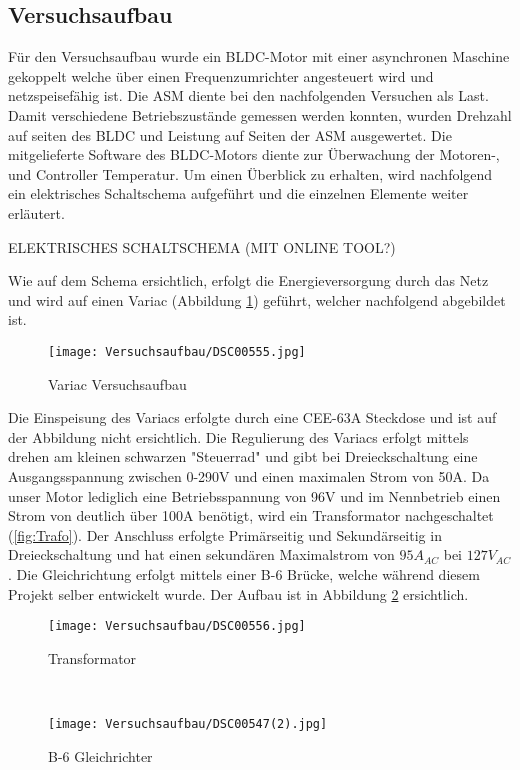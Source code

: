 \subsection{Versuchsaufbau}\label{subsec:Versuchsaufbau}
Für den Versuchsaufbau wurde ein BLDC-Motor mit einer asynchronen Maschine gekoppelt welche über einen Frequenzumrichter angesteuert wird und netzspeisefähig ist. Die ASM diente bei den nachfolgenden Versuchen als Last. Damit verschiedene Betriebszustände gemessen werden konnten, wurden Drehzahl auf seiten des BLDC und Leistung auf Seiten der ASM ausgewertet. Die mitgelieferte Software des BLDC-Motors diente zur Überwachung der Motoren-, und Controller Temperatur. Um einen Überblick zu erhalten, wird nachfolgend ein elektrisches Schaltschema aufgeführt und die einzelnen Elemente weiter erläutert.


ELEKTRISCHES SCHALTSCHEMA (MIT ONLINE TOOL?)



Wie auf dem Schema ersichtlich, erfolgt die Energieversorgung durch das Netz und wird auf einen Variac (Abbildung \ref{fig:Variac}) geführt, welcher nachfolgend abgebildet ist.

\begin{figure}[H]
	\begin{center}
		\texttt{[image: Versuchsaufbau/DSC00555.jpg]}
		\caption[Variac Versuchsaufbau]{Variac Versuchsaufbau}
		\label{fig:Variac}
	\end{center}
\end{figure}

Die Einspeisung des Variacs erfolgte durch eine CEE-63A Steckdose und ist auf der Abbildung nicht ersichtlich. Die Regulierung des Variacs erfolgt mittels drehen am kleinen schwarzen "Steuerrad" und gibt bei Dreieckschaltung eine Ausgangsspannung zwischen 0-290V und einen maximalen Strom von 50A. Da unser Motor lediglich eine Betriebsspannung von 96V und im Nennbetrieb einen Strom von deutlich über 100A benötigt, wird ein Transformator nachgeschaltet (\ref{fig:Trafo}). Der Anschluss erfolgte Primärseitig und Sekundärseitig in Dreieckschaltung und hat einen sekundären Maximalstrom von $95A_{AC}$ bei $127V_{AC}$. Die Gleichrichtung erfolgt mittels einer B-6 Brücke, welche während diesem Projekt selber entwickelt wurde. Der Aufbau ist in Abbildung \ref{fig:B-6} ersichtlich.

\begin{figure}[H]
	\centering
	\begin{minipage}[H]{.4\linewidth} %
		\centering
		\texttt{[image: Versuchsaufbau/DSC00556.jpg]}
		\caption[Transformator Versuchsaufbau]{Transformator}
		\label{fig:Trafo}
	\end{minipage}
	\ %
	\begin{minipage}[H]{.4\linewidth} %
		\centering
		\texttt{[image: Versuchsaufbau/DSC00547(2).jpg]}
		\caption[B-6 Gleichrichter]{B-6 Gleichrichter}
		\label{fig:B-6}
	\end{minipage}
\end{figure}

